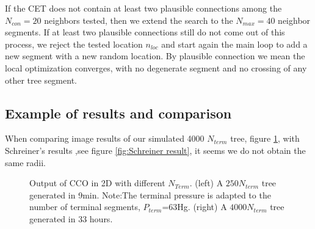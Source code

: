 \documentclass[a4paper, 11pt]{article} %
\begin{document}
If the CET does not contain at least two plausible connections among the $N_{con} = 20$ neighbors tested, then we extend the search to the $N_{max} = 40$ neighbor segments. If at least two plausible connections still do not come out of this process, we reject the tested location $n_{loc}$ and start again the main loop to add a new segment with a new random location.
By plausible connection we mean the local optimization converges, with no degenerate segment and no crossing of any other tree segment. 


\subsection{Example of results and comparison}
When comparing image results of our simulated 4000 $N_{term}$ tree, figure \ref{fig:CCO 2D}, with Schreiner's results \cite{schreiner1993computer},see figure \ref{fig:Schreiner result}, it seems we do not obtain the same radii. 
\begin{figure}[htbp]
\centering
{}
\caption{Output of CCO in 2D with different $N_{Term}$. (left) A $250 N_{term}$ tree generated in \unit{9}{min}. Note:The terminal pressure is adapted to the number of terminal segments, $P_{term}$=\unit{63}{\milli\meter}Hg. (right) A $4000 N_{term}$ tree generated in 33 hours.}
\label{fig:CCO 2D}
\end{figure}
\end{document}
